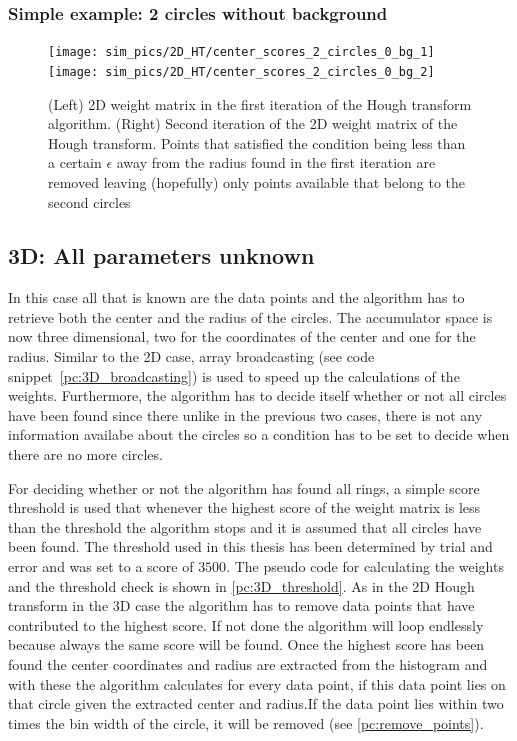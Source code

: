 \documentclass[11pt]{scrreprt}
\begin{document}

\subsubsection{Simple example: 2 circles without background} %
\label{ssub:simple_example_of_2_circles_without_background}
\begin{figure}[hp]
  \centering
  \texttt{[image: sim\_pics/2D\_HT/center\_scores\_2\_circles\_0\_bg\_1]}%
  \texttt{[image: sim\_pics/2D\_HT/center\_scores\_2\_circles\_0\_bg\_2]}

  \caption[2D weight matrix, first iteration]{(Left) 2D weight matrix in the first iteration of the Hough transform algorithm. (Right) Second iteration
  of the 2D weight matrix of the Hough transform. Points that satisfied the condition being less than a certain $\epsilon$ away from the radius found in the first iteration are removed leaving (hopefully) only points available that belong to the second circles}
  \label{fig:2d_weights_01}
\end{figure}

\subsection{3D: All parameters unknown} %
\label{sub:3d_nothing_is_known_find_everything}
In this case all that is known are the data points and the algorithm has to retrieve both the center and the radius of the circles. 
The accumulator space is now three dimensional, two for the coordinates of the center and one for the radius. Similar to the 2D case, 
array broadcasting (see code snippet~\ref{pc:3D_broadcasting}) is used to speed up the calculations of the weights. Furthermore, 
the algorithm has to decide itself whether or not  all circles have been found since there unlike in the previous two cases, there is not 
any information availabe about the circles so a condition has to be set to decide when there are no more circles.

For deciding whether or not the algorithm has found all rings, a simple score threshold is used that whenever the highest score
of the weight matrix is less than the threshold the algorithm stops and it is assumed that all circles have been found. The threshold
used in this thesis has been determined by trial and error and was set to a score of $3500$. The pseudo code for calculating the weights 
and the threshold check is shown in \ref{pc:3D_threshold}. As in the 2D Hough transform in the 3D case the algorithm has to remove data 
points that have contributed to the highest score. If not done the algorithm will loop endlessly because always the same score will be 
found. Once the highest score has been found the center coordinates and radius are extracted from the histogram and with these the 
algorithm calculates for every data point, if this data point lies on that circle given the extracted center and radius.If the data point 
lies within two times the bin width of the circle, it will be removed (see \ref{pc:remove_points}).
\end{document}
